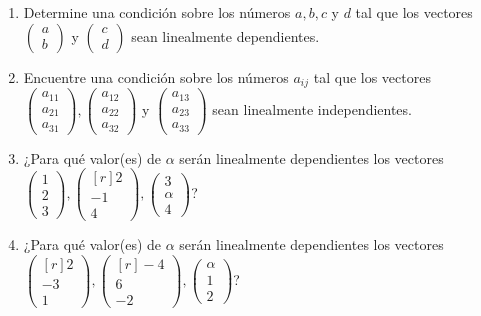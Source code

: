 \begin{enumerate}[start=90]
    \item Determine una condición sobre los números $a, b, c$ y $d$ tal que los vectores $\begin{pmatrix*}a \\ b\end{pmatrix*}$ y $\begin{pmatrix*}c \\ d\end{pmatrix*}$ sean linealmente dependientes.
    \item Encuentre una condición sobre los números $a_{i j}$ tal que los vectores $\begin{pmatrix*}a_{11} \\ a_{21} \\ a_{31}\end{pmatrix*},\begin{pmatrix*}a_{12} \\ a_{22} \\ a_{32}\end{pmatrix*}$ y $\begin{pmatrix*}a_{13} \\ a_{23} \\ a_{33}\end{pmatrix*}$ sean linealmente independientes.
    \item ¿Para qué valor(es) de $\alpha$ serán linealmente dependientes los vectores $\begin{pmatrix*}1 \\ 2 \\ 3\end{pmatrix*},\begin{pmatrix*}[r]2 \\ -1 \\ 4\end{pmatrix*},\begin{pmatrix*}3 \\ \alpha \\ 4\end{pmatrix*}$?
    \item ¿Para qué valor(es) de $\alpha$ serán linealmente dependientes los vectores $\begin{pmatrix*}[r]2 \\ -3 \\ 1\end{pmatrix*},\begin{pmatrix*}[r]-4 \\ 6 \\ -2\end{pmatrix*},\begin{pmatrix*}\alpha \\ 1 \\ 2\end{pmatrix*}$?

\end{enumerate}

